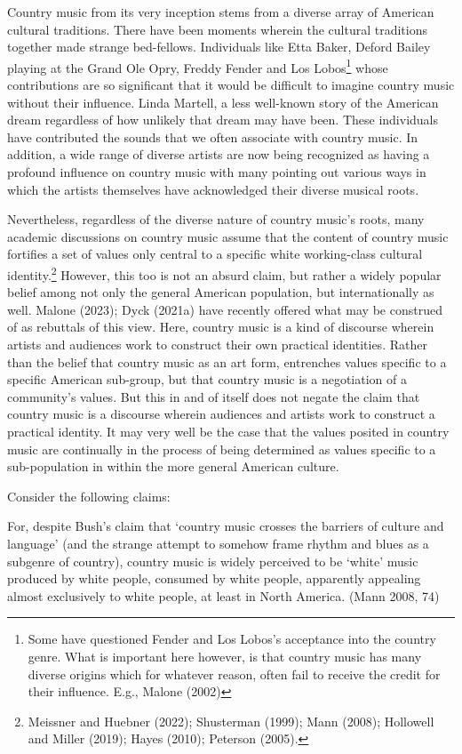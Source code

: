 \documentclass[
  letterpaper,
  DIV=11,
  numbers=noendperiod]{scrartcl}
\theoremstyle{remark}
\begin{document}
Country music from its very inception stems from a diverse array of
American cultural traditions. There have been moments wherein the
cultural traditions together made strange bed-fellows. Individuals like
Etta Baker, Deford Bailey playing at the Grand Ole Opry, Freddy Fender
and Los Lobos\footnote{Some have questioned Fender and Los Lobos's
  acceptance into the country genre. What is important here however, is
  that country music has many diverse origins which for whatever reason,
  often fail to receive the credit for their influence. E.g., Malone
  (2002)} whose contributions are so significant that it would be
difficult to imagine country music without their influence. Linda
Martell, a less well-known story of the American dream regardless of how
unlikely that dream may have been. These individuals have contributed
the sounds that we often associate with country music. In addition, a
wide range of diverse artists are now being recognized as having a
profound influence on country music with many pointing out various ways
in which the artists themselves have acknowledged their diverse musical
roots.

Nevertheless, regardless of the diverse nature of country music's roots,
many academic discussions on country music assume that the content of
country music fortifies a set of values only central to a specific white
working-class cultural identity.\footnote{Meissner and Huebner (2022);
  Shusterman (1999); Mann (2008); Hollowell and Miller (2019); Hayes
  (2010); Peterson (2005).} However, this too is not an absurd claim,
but rather a widely popular belief among not only the general American
population, but internationally as well. Malone (2023); Dyck (2021a)
have recently offered what may be construed of as rebuttals of this
view. Here, country music is a kind of discourse wherein artists and
audiences work to construct their own practical identities. Rather than
the belief that country music as an art form, entrenches values specific
to a specific American sub-group, but that country music is a
negotiation of a community's values. But this in and of itself does not
negate the claim that country music is a discourse wherein audiences and
artists work to construct a practical identity. It may very well be the
case that the values posited in country music are continually in the
process of being determined as values specific to a sub-population in
within the more general American culture.

Consider the following claims:

For, despite Bush's claim that `country music crosses the barriers of
culture and language' (and the strange attempt to somehow frame rhythm
and blues as a subgenre of country), country music is widely perceived
to be `white' music produced by white people, consumed by white people,
apparently appealing almost exclusively to white people, at least in
North America. (Mann 2008, 74)
\end{document}
